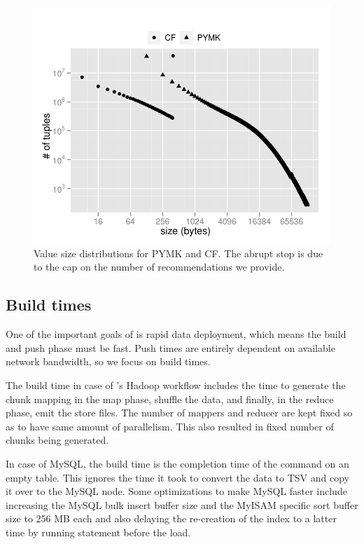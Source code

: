 \begin{figure}
  \centering
    \includegraphics[scale=0.55]{images/data_distribution.pdf}
  \caption{Value size distributions for PYMK and CF. The abrupt stop
is due to the cap on the number of recommendations we provide.}
  \label{distribution}
\end{figure}

\subsection{Build times}

One of the important goals of \projectname{} is rapid data deployment,
which means the build and push phase must be fast. Push times are
entirely dependent on available network bandwidth, so we focus on
build times.
 
The build time in case of \projectname's Hadoop workflow includes the
time to generate the chunk mapping in the map phase, shuffle the data,
and finally, in the reduce phase, emit the store files. The number of
mappers and reducer are kept fixed so as to have same amount of
parallelism. This also resulted in fixed number of chunks being
generated.

In case of MySQL, the build time is the completion time of the
 command on an empty table. This ignores the 
time it took to convert the data to TSV and copy it over to the MySQL 
node. Some optimizations to make MySQL faster include increasing the 
MySQL bulk insert buffer size and the MyISAM specific sort buffer 
size to 256 MB each and also delaying the re-creation of the index 
to a latter time by running  statement 
before the load. 

